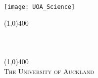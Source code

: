 \begin{titlepage}
    \begin{center}
        \begin{center}
            \texttt{[image: UOA\_Science]}
        \end{center}
        \vfill
        \line(1,0){400}\\[1mm]
        \huge{\textbf{\thetitle}}\\
        \Large{\color{HeadColor}{\getsubtitle}}\\
        \theauthor \\
        \line(1,0){400}\\[3mm]
        \vfill
        \large{\textsc{The University of Auckland}}
    \end{center}
\end{titlepage}
